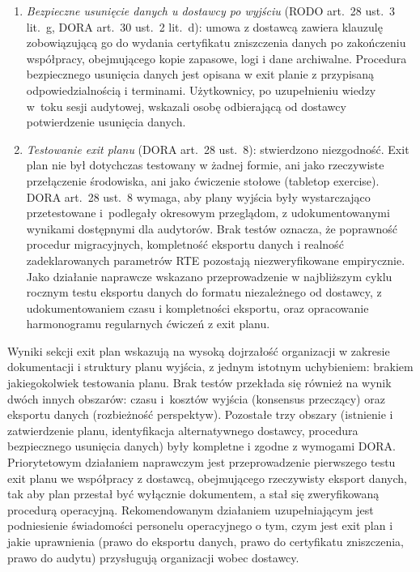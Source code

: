 \begin{enumerate}[label=(\roman*)]
  \item \textit{Bezpieczne usunięcie danych u dostawcy po wyjściu} (RODO art.~28 ust.~3 lit.~g, DORA art.~30 ust.~2 lit.~d): umowa z dostawcą zawiera klauzulę zobowiązującą go do wydania certyfikatu zniszczenia danych po zakończeniu współpracy, obejmującego kopie zapasowe, logi i dane archiwalne. Procedura bezpiecznego usunięcia danych jest opisana w exit planie z przypisaną odpowiedzialnością i terminami. Użytkownicy, po uzupełnieniu wiedzy w~toku sesji audytowej, wskazali osobę odbierającą od dostawcy potwierdzenie usunięcia danych.

  \item \textit{Testowanie exit planu} (DORA art.~28 ust.~8): stwierdzono niezgodność. Exit plan nie był dotychczas testowany w żadnej formie, ani jako rzeczywiste przełączenie środowiska, ani jako ćwiczenie stołowe (tabletop exercise). DORA art.~28 ust.~8 wymaga, aby plany wyjścia były wystarczająco przetestowane i~podlegały okresowym przeglądom, z udokumentowanymi wynikami dostępnymi dla audytorów. Brak testów oznacza, że poprawność procedur migracyjnych, kompletność eksportu danych i realność zadeklarowanych parametrów RTE pozostają niezweryfikowane empirycznie. Jako działanie naprawcze wskazano przeprowadzenie w najbliższym cyklu rocznym testu eksportu danych do formatu niezależnego od dostawcy, z udokumentowaniem czasu i kompletności eksportu, oraz opracowanie harmonogramu regularnych ćwiczeń z exit planu.
\end{enumerate}

Wyniki sekcji exit plan wskazują na wysoką dojrzałość organizacji w zakresie dokumentacji i struktury planu wyjścia, z jednym istotnym uchybieniem: brakiem jakiegokolwiek testowania planu. Brak testów przekłada się również na wynik dwóch innych obszarów: czasu i~kosztów wyjścia (konsensus przeczący) oraz eksportu danych (rozbieżność perspektyw). Pozostałe trzy obszary (istnienie i zatwierdzenie planu, identyfikacja alternatywnego dostawcy, procedura bezpiecznego usunięcia danych) były kompletne i zgodne z wymogami DORA. Priorytetowym działaniem naprawczym jest przeprowadzenie pierwszego testu exit planu we współpracy z dostawcą, obejmującego rzeczywisty eksport danych, tak aby plan przestał być wyłącznie dokumentem, a stał się zweryfikowaną procedurą operacyjną. Rekomendowanym działaniem uzupełniającym jest podniesienie świadomości personelu operacyjnego o tym, czym jest exit plan i jakie uprawnienia (prawo do eksportu danych, prawo do certyfikatu zniszczenia, prawo do audytu) przysługują organizacji wobec dostawcy.

